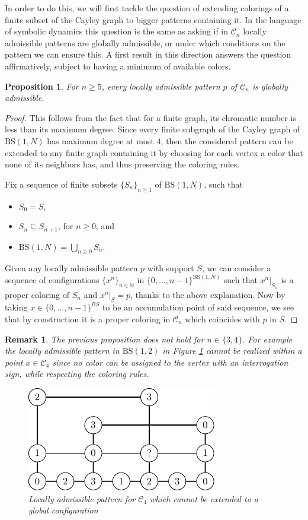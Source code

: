\documentclass[cupthm,crop,info]{CUP-JNL-ETS}%
\theoremstyle{cupplain}
\newtheorem{proposition}[theorem]{Proposition}
\theoremstyle{cupdefinition}
\theoremstyle{cupremark}
\newtheorem{remark}[theorem]{Remark}
\theoremstyle{cupproof}
\newtheorem{proof}{Proof}
\numberwithin{equation}{section}
\newcommand{\BS}[1][N]{\mathrm{BS}(1,#1)}
\begin{document}
In order to do this, we will first tackle the question of extending colorings of a finite subset of the Cayley graph to bigger patterns containing it. In the language of symbolic dynamics this question is the same as asking if in $\mathcal{C}_n$ locally admissible patterns are globally admissible, or under which conditions on the pattern we can ensure this. A first result in this direction answers the question affirmatively, subject to having a minimum of available colors.
\begin{proposition} \label{prop:loc_adm_5_colors}
	For $n\ge 5$, every locally admissible pattern $p$ of $\mathcal{C}_n$ is globally admissible.
\end{proposition}
\begin{proof}
	This follows from the fact that for a finite graph, its chromatic number is less than its maximum degree. Since every finite subgraph of the Cayley graph of $\BS$ has maximum degree at most $4$, then the considered pattern can be extended to any finite graph containing it by choosing for each vertex a color that none of its neighbors has, and thus preserving the coloring rules. 
	
	Fix a sequence of finite subsets $\{S_n\}_{n\ge 1}$ of $\BS$, such that
	\begin{itemize}
	\item $S_0=S$,
	\item $S_n\subseteq S_{n+1}$, for $n\ge 0$, and
	\item $\BS=\bigcup_{n\ge 0}S_n$.
	\end{itemize}
	
	Given any locally admissible pattern $p$ with support $S$, we can consider a sequence of configurations $\{x^{n}\}_{n\in \mathbb{N}}$ in $\{0,\ldots,n-1\}^{\BS}$ such that $x^{n}|_{S_n}$ is a proper coloring of $S_n$ and $x^{n}|_{S}=p$, thanks to the above explanation. Now by taking $x\in \{0,\ldots,n-1\}^{BS}$ to be an accumulation point of said sequence, we see that by construction it is a proper coloring in $\mathcal{C}_n$ which coincides with $p$ in $S$.
\end{proof}
\begin{remark} The previous proposition does not hold for $n\in \{3,4\}$. For example the locally admissible pattern in $\BS[2]$ in Figure \ref{fig:no_extend_gap} cannot be realized within a point $x \in \mathcal{C}_4$ since no color can be assigned to the vertex with an interrogation sign, while respecting the coloring rules.
	\begin{figure}
		\centering
		\includegraphics{non_globallyadmissible.pdf}
		\caption{Locally admissible pattern for $\mathcal{C}_4$ which cannot be extended to a global configuration}
		\label{fig:no_extend_gap}
	\end{figure}	
\end{remark}
\end{document}
